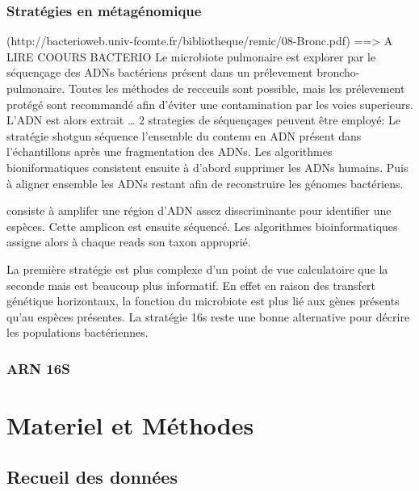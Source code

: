 \documentclass[12pt,a4paper]{article}
\begin{document}
\subsubsection{Stratégies en métagénomique}
(http://bacterioweb.univ-fcomte.fr/bibliotheque/remic/08-Bronc.pdf) ==> A LIRE COOURS BACTERIO
Le microbiote pulmonaire est explorer par le séquençage des ADNs bactériens présent dans un prélevement broncho-pulmonaire. Toutes les méthodes de recceuils sont possible, mais les prélevement protégé sont recommandé afin d’éviter une contamination par les voies superieurs.
L’ADN est alors extrait …
2 strategies de séquençages peuvent être employé:
Le stratégie shotgun séquence l’ensemble du contenu en ADN présent dans l’échantillons après une fragmentation des ADNs. Les algorithmes bioniformatiques consistent ensuite à d’abord supprimer les ADNs humains. Puis à aligner ensemble les ADNs restant afin de reconstruire les génomes bactériens.

consiste à amplifer une région d’ADN assez disscriminante pour identifier une espèces. Cette amplicon est ensuite séquencé. Les algorithmes bioinformatiques assigne alors à chaque reads son taxon approprié.

La première stratégie est plus complexe d’un point de vue calculatoire que la seconde mais est beaucoup plus informatif. En effet en raison des transfert génétique horizontaux, la fonction du microbiote est plus lié aux gènes présents qu’au espèces présentes.
La stratégie 16s reste une bonne alternative pour décrire les populations bactériennes.

\subsubsection{ARN 16S}



\section{Materiel et Méthodes}
\subsection{Recueil des données}
\end{document}
